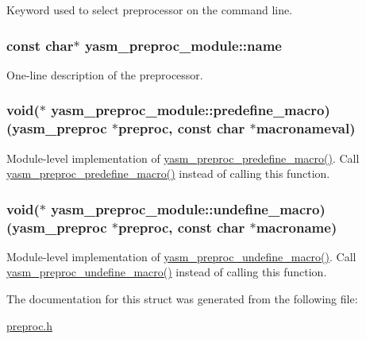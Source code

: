 Keyword used to select preprocessor on the command line. \hypertarget{structyasm__preproc__module_ae232113acc58ef454e6c6df75abc6ce7}{
\subsubsection[{name}]{\setlength{\rightskip}{0pt plus 5cm}const char$\ast$ yasm\-\_\-preproc\-\_\-module\-::name}}\label{structyasm__preproc__module_ae232113acc58ef454e6c6df75abc6ce7}
One-\/line description of the preprocessor. \hypertarget{structyasm__preproc__module_a5fee10336340a7523a4397fd1226ce24}{
\subsubsection[{predefine\-\_\-macro}]{\setlength{\rightskip}{0pt plus 5cm}void($\ast$ yasm\-\_\-preproc\-\_\-module\-::predefine\-\_\-macro)({\bf yasm\-\_\-preproc} $\ast$preproc, const char $\ast$macronameval)}}\label{structyasm__preproc__module_a5fee10336340a7523a4397fd1226ce24}
Module-\/level implementation of \hyperlink{preproc_8h_a7590a7d54007d8065b66e49c21e91c7b}{yasm\-\_\-preproc\-\_\-predefine\-\_\-macro()}. Call \hyperlink{preproc_8h_a7590a7d54007d8065b66e49c21e91c7b}{yasm\-\_\-preproc\-\_\-predefine\-\_\-macro()} instead of calling this function. \hypertarget{structyasm__preproc__module_ab046fe71ecaa89b656337afca1183da9}{
\subsubsection[{undefine\-\_\-macro}]{\setlength{\rightskip}{0pt plus 5cm}void($\ast$ yasm\-\_\-preproc\-\_\-module\-::undefine\-\_\-macro)({\bf yasm\-\_\-preproc} $\ast$preproc, const char $\ast$macroname)}}\label{structyasm__preproc__module_ab046fe71ecaa89b656337afca1183da9}
Module-\/level implementation of \hyperlink{preproc_8h_a40378943ea110d31e366a92220371eb8}{yasm\-\_\-preproc\-\_\-undefine\-\_\-macro()}. Call \hyperlink{preproc_8h_a40378943ea110d31e366a92220371eb8}{yasm\-\_\-preproc\-\_\-undefine\-\_\-macro()} instead of calling this function. 

The documentation for this struct was generated from the following file\-:\begin{DoxyCompactItemize}
\item 
\hyperlink{preproc_8h}{preproc.\-h}\end{DoxyCompactItemize}

